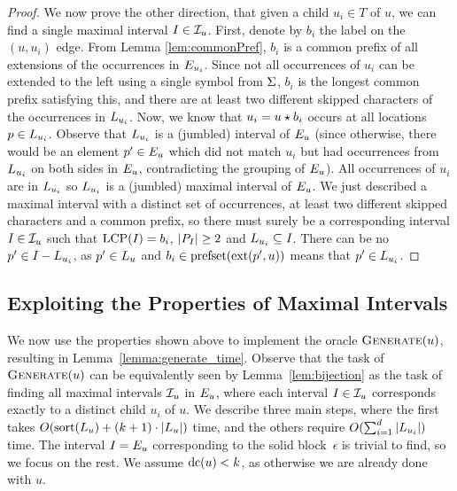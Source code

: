 \begin{proof}
    We now prove the other direction, that given a child $u_i \in T$ of $u$, we can find a single maximal interval $I_{} \in \mathcal{I}_{u}$.    
    First, denote by $b_i$ the label on the $(u, u_i)$ edge. From Lemma \ref{lem:commonPref}, $b_i$ is a common prefix of all extensions of the occurrences in $E_{u_i}$. Since not all occurrences of $u_i$ can be extended to the left using a single symbol from $\Sigma$, $b_i$ is the longest common prefix satisfying this, and there are at least two different skipped characters of the occurrences in $L_{u_i}$. 
    Now, we know that $u_i = u \star b_i$ occurs at all locations $p \in L_{u_i}$. Observe that $L_{u_i}$ is a (jumbled) interval of $E_{u}$ (since otherwise, there would be an element $p' \in E_{u}$ which did not match $u_i$ but had occurrences from $L_{u_i}$ on both sides in $E_{u}$, contradicting the grouping of $E_{u}$). All occurrences of $u_i$ are in $L_{u_i}$ so $L_{u_i}$ is a (jumbled) maximal interval of $E_{u}$.
    We just described a maximal interval with a distinct set of occurrences, at least two different skipped characters and a common prefix, so there must surely be a corresponding interval $I_{} \in \mathcal{I}_{u}$ such that $\operatorname{LCP}(I_{}) = b_i$, $|P_{I_{}}| \geq 2$ and $L_{u_i} \subseteq I_{}$. There can be no $p' \in I_{} - L_{u_i}$, as $p' \in L_{u}$ and $b_i \in \operatorname{prefset}(\operatorname{ext}(p', u))$ means that $p' \in L_{u_i}$.
\end{proof}


\subsection{Exploiting the Properties of Maximal Intervals}
%
We now use the properties shown above to implement the oracle $\operatorname{\textsc{Generate}}(u)$, resulting in Lemma~\ref{lemma:generate_time}. Observe that the task of $\operatorname{\textsc{Generate}}(u)$ can be equivalently seen by Lemma~\ref{lem:bijection} as the task of finding all maximal intervals $\mathcal{I}_{u}$ in $E_{u}$, where each interval $I_{} \in \mathcal{I}_{u}$ corresponds exactly to a distinct child $u_i$ of $u$. We describe three main steps, where the first takes $O(\operatorname{sort}(L_{u}) + (k+1) \cdot |L_{u}| )$ time, and the others require $O(\sum_{i=1}^d |L_{u_i}|)$ time. The interval $I_{} = E_{u}$ corresponding to the solid block~$\epsilon$ is trivial to find, so we focus on the rest. We assume $\operatorname{dc}(u) < k$, as otherwise we are already done with $u$.


